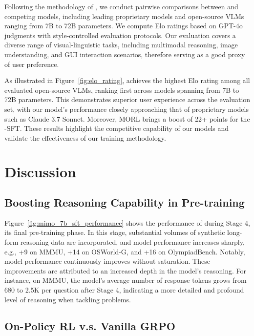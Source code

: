 Following the methodology of \citep{Chou2024VisionArena2R}, we conduct pairwise comparisons between \mimovl{} and competing models, including leading proprietary models and open-source VLMs ranging from 7B to 72B parameters. We compute Elo ratings based on GPT-4o judgments with style-controlled evaluation protocols. 
Our evaluation covers a diverse range of visual-linguistic tasks, including multimodal reasoning, image understanding, and GUI interaction scenarios, therefore serving as a good proxy of user preference.

As illustrated in Figure~\ref{fig:elo_rating}, \mimovlrl{} achieves the highest Elo rating among all evaluated open-source VLMs, ranking first across models spanning from 7B to 72B parameters. This demonstrates superior user experience across the evaluation set, with our model's performance closely approaching that of proprietary models such as Claude 3.7 Sonnet. 
Moreover, MORL brings a boost of 22+ points for the \mimovl{}-SFT.
These results highlight the competitive capability of our models and validate the effectiveness of our training methodology.



\section{Discussion}


\subsection{Boosting Reasoning Capability in Pre-training}
Figure~\ref{fig:mimo_7b_sft_performance} shows the performance of \mimovlsft{} during Stage 4, its final pre-training phase. In this stage, substantial volumes of synthetic long-form reasoning data are incorporated, and model performance increases sharply, e.g., +9 on MMMU, +14 on OSWorld-G, and +16 on OlympiadBench. Notably, model performance continuously improves without saturation. 
These improvements are attributed to an increased depth in the model's reasoning. For instance, on  MMMU, the model's average number of response tokens grows from 680 to 2.5K per question after Stage 4, indicating a more detailed and profound level of reasoning when tackling problems. 



\subsection{On-Policy RL v.s. Vanilla GRPO}





